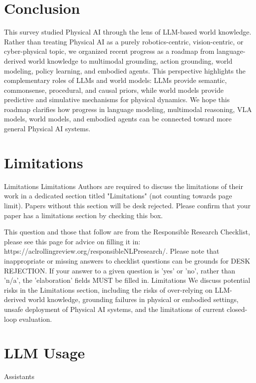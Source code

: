 \section{Conclusion}
\label{sec:conclusion}

This survey studied Physical AI through the lens of LLM-based world knowledge. 
Rather than treating Physical AI as a purely robotics-centric, vision-centric, or cyber-physical topic, we organized recent progress as a roadmap from language-derived world knowledge to multimodal grounding, action grounding, world modeling, policy learning, and embodied agents. 
This perspective highlights the complementary roles of LLMs and world models: LLMs provide semantic, commonsense, procedural, and causal priors, while world models provide predictive and simulative mechanisms for physical dynamics. 
We hope this roadmap clarifies how progress in language modeling, multimodal reasoning, VLA models, world models, and embodied agents can be connected toward more general Physical AI systems.



\section{Limitations}
Limitations
Limitations
Authors are required to discuss the limitations of their work in a dedicated section titled "Limitations" (not counting towards page limit). Papers without this section will be desk rejected. Please confirm that your paper has a limitations section by checking this box.

This question and those that follow are from the Responsible Research Checklist, please see this page for advice on filling it in: https://aclrollingreview.org/responsibleNLPresearch/. Please note that inappropriate or missing answers to checklist questions can be grounds for DESK REJECTION. If your answer to a given question is 'yes' or 'no', rather than 'n/a', the 'elaboration' fields MUST be filled in.
Limitations
We discuss potential risks in the Limitations section, including the risks of over-relying on LLM-derived world knowledge, grounding failures in physical or embodied settings, unsafe deployment of Physical AI systems, and the limitations of current closed-loop evaluation.

\section{LLM Usage}
Assistants